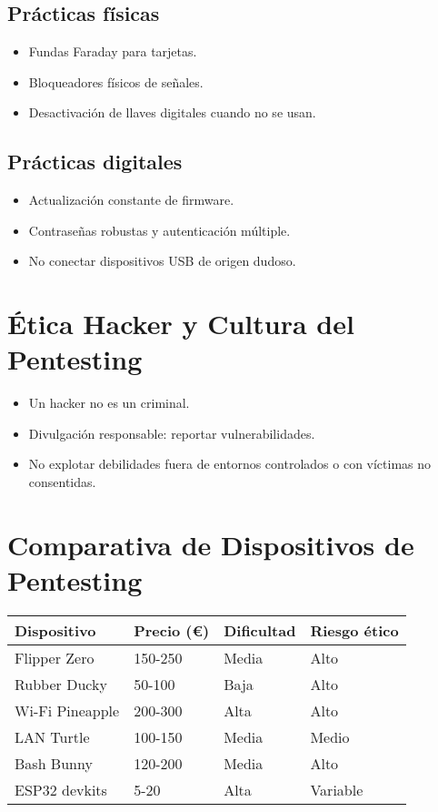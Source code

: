 \documentclass[a4paper,12pt]{article}
\begin{document}
\subsection{Prácticas físicas}

\begin{itemize}
    \item Fundas Faraday para tarjetas.
    \item Bloqueadores físicos de señales.
    \item Desactivación de llaves digitales cuando no se usan.
\end{itemize}

\subsection{Prácticas digitales}

\begin{itemize}
    \item Actualización constante de firmware.
    \item Contraseñas robustas y autenticación múltiple.
    \item No conectar dispositivos USB de origen dudoso.
\end{itemize}

\section{Ética Hacker y Cultura del Pentesting}

\begin{itemize}
    \item Un hacker no es un criminal.
    \item Divulgación responsable: reportar vulnerabilidades.
    \item No explotar debilidades fuera de entornos controlados o con víctimas no consentidas.
\end{itemize}

\section{Comparativa de Dispositivos de Pentesting}

\begin{longtable}{|p{4cm}|p{2cm}|p{2cm}|p{3cm}|}
\hline
\textbf{Dispositivo} & \textbf{Precio (€)} & \textbf{Dificultad} & \textbf{Riesgo ético} \\
\hline
Flipper Zero & 150-250 & Media & Alto \\
Rubber Ducky & 50-100 & Baja & Alto \\
Wi-Fi Pineapple & 200-300 & Alta & Alto \\
LAN Turtle & 100-150 & Media & Medio \\
Bash Bunny & 120-200 & Media & Alto \\
ESP32 devkits & 5-20 & Alta & Variable \\
\hline
\end{longtable}
\end{document}
